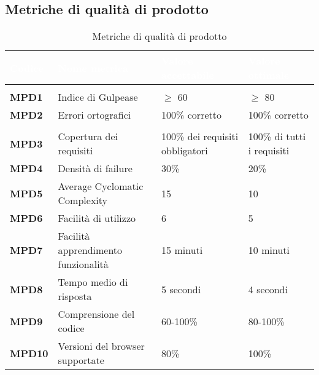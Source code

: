 \newpage

\subsection{Metriche di qualità di prodotto}

\renewcommand{\arraystretch}{1.5}

\begin{longtable}{C{2.5cm} | C{4cm} | C{5cm} | C{3.5cm}}
\textcolor{white}{\textbf{Codice}}&
\textcolor{white}{\textbf{Nome metrica}}&
\textcolor{white}{\textbf{Valore accettabile}}&
\textcolor{white}{\textbf{Valore ottimale}}\\	
\endhead
\endfoot
{}\caption{Metriche di qualità di prodotto}
\endlastfoot

 \\

	\textbf{MPD1} & Indice di Gulpease & $\geq$ 60 & $\geq$ 80\\
	\textbf{MPD2} & Errori ortografici & 100\% corretto & 100\% corretto \\
	
 \\

	\textbf{MPD3} & Copertura dei requisiti & 100\% dei requisiti obbligatori & 100\% di tutti i requisiti \\
		
	\textbf{MPD4} & Densità di failure & 30\% & 20\% \\

	\textbf{MPD5} & Average Cyclomatic Complexity & 15 & 10 \\		
	\textbf{MPD6} & Facilità di utilizzo & 6 & 5 \\
	\textbf{MPD7} & Facilità apprendimento funzionalità & 15 minuti & 10 minuti\\

 	\textbf{MPD8} & Tempo medio di risposta & 5 secondi & 4 secondi \\
	
 	\textbf{MPD9} & Comprensione del codice & 60-100\% & 80-100\% \\

	\textbf{MPD10} & Versioni del browser supportate & 80\% & 100\% \\
\end{longtable}


	

